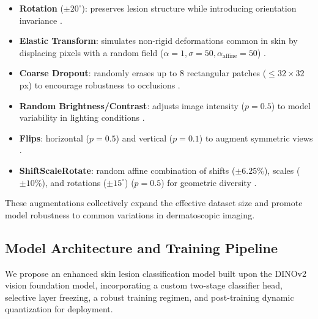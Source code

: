 \begin{itemize}
  \item \textbf{Rotation} (\(\pm20^\circ\)): preserves lesion structure while introducing orientation invariance \cite{Buslaev2020}.
  \item \textbf{Elastic Transform}: simulates non‐rigid deformations common in skin by displacing pixels with a random field (\(\alpha=1, \sigma=50, \alpha_{\text{affine}}=50\)) \cite{AlbumentationsAPI2024}.
  \item \textbf{Coarse Dropout}: randomly erases up to 8 rectangular patches (\(\le32\times32\) px) to encourage robustness to occlusions \cite{AlbumentationsDocs2024}.
  \item \textbf{Random Brightness/Contrast}: adjusts image intensity (\(p=0.5\)) to model variability in lighting conditions \cite{AlbumentationsDocs2024}.
  \item \textbf{Flips}: horizontal (\(p=0.5\)) and vertical (\(p=0.1\)) to augment symmetric views \cite{AlbumentationsAPI2024}.
  \item \textbf{ShiftScaleRotate}: random affine combination of shifts (\(\pm6.25\%\)), scales (\(\pm10\%\)), and rotations (\(\pm15^\circ\)) (\(p=0.5\)) for geometric diversity \cite{AlbumentationsAPI2024}.
\end{itemize}

These augmentations collectively expand the effective dataset size and promote model robustness to common variations in dermatoscopic imaging.

\subsection{Model Architecture and Training Pipeline}

We propose an enhanced skin lesion classification model built upon the DINOv2 vision foundation model, incorporating a custom two-stage classifier head, selective layer freezing, a robust training regimen, and post-training dynamic quantization for deployment.

